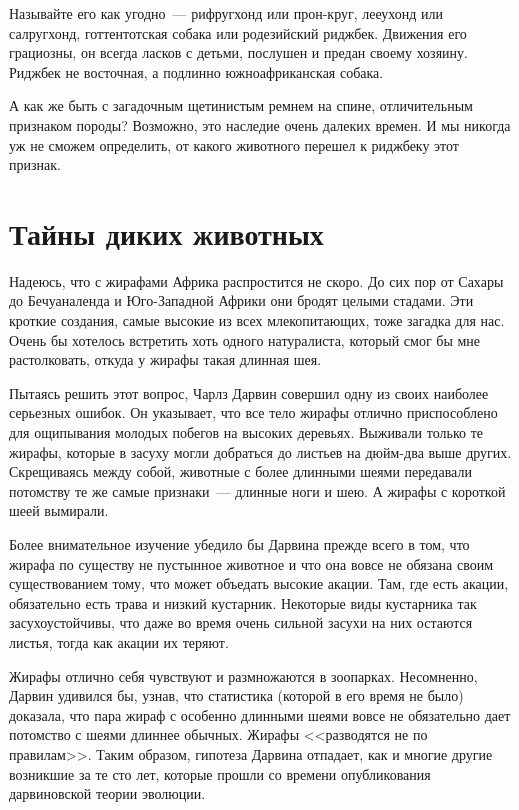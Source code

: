 \documentclass[12pt,a4paper,twoside,openany,svgnames]{memoir}
\begin{document}
Называйте его как угодно~--- рифругхонд или прон-круг, лееухонд или салругхонд, готтентотская собака или родезийский риджбек. Движения его грациозны, он всегда ласков с детьми, послушен и предан своему хозяину. Риджбек не восточная, а подлинно южноафриканская собака.

А как же быть с загадочным щетинистым ремнем на спине, отличительным признаком породы? Возможно, это наследие очень далеких времен. И мы никогда уж не сможем определить, от какого животного перешел к риджбеку этот признак.

\chapter{Тайны диких животных}

Надеюсь, что с жирафами Африка распростится не скоро. До сих пор от Сахары до Бечуаналенда и Юго-Западной Африки они бродят целыми стадами. Эти кроткие создания, самые высокие из всех млекопитающих, тоже загадка для нас. Очень бы хотелось встретить хоть одного натуралиста, который смог бы мне растолковать, откуда у жирафы такая длинная шея.

Пытаясь решить этот вопрос, Чарлз Дарвин совершил одну из своих наиболее серьезных ошибок. Он указывает, что все тело жирафы отлично приспособлено для ощипывания молодых побегов на высоких деревьях. Выживали только те жирафы, которые в засуху могли добраться до листьев на дюйм-два выше других. Скрещиваясь между собой, животные с более длинными шеями передавали потомству те же самые признаки~--- длинные ноги и шею. А жирафы с короткой шеей вымирали.

Более внимательное изучение убедило бы Дарвина прежде всего в том, что жирафа по существу не пустынное животное и что она вовсе не обязана своим существованием тому, что может объедать высокие акации. Там, где есть акации, обязательно есть трава и низкий кустарник. Некоторые виды кустарника так засухоустойчивы, что даже во время очень сильной засухи на них остаются листья, тогда как акации их теряют.

Жирафы отлично себя чувствуют и размножаются в зоопарках. Несомненно, Дарвин удивился бы, узнав, что статистика (которой в его время не было) доказала, что пара жираф с особенно длинными шеями вовсе не обязательно дает потомство с шеями длиннее обычных. Жирафы <<разводятся не по правилам>>. Таким образом, гипотеза Дарвина отпадает, как и многие другие возникшие за те сто лет, которые прошли со времени опубликования дарвиновской теории эволюции.
\end{document}
